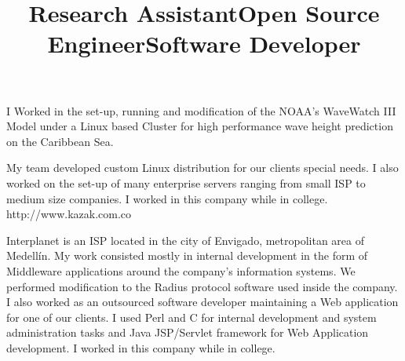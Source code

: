 \begin{resume}
\title{\textbf{Research Assistant}}
\begin{position}
I Worked in the set-up, running and modification of the NOAA's WaveWatch III Model under a Linux based Cluster
for high performance wave height prediction on the Caribbean Sea.
\end{position}


\title{\textbf{Open Source Engineer}}
\begin{position}
My team developed custom  Linux distribution for our clients
special needs. I also worked on  the set-up of many enterprise
servers ranging from small ISP to medium size companies. I worked in this company while in college.
http://www.kazak.com.co
\end{position}
\newline
\newline
\newline
\newline
\newline



\title{\textbf{Software Developer}}
\begin{position}
Interplanet is an  ISP located in the city of Envigado, metropolitan area of Medell\'{i}n.
My work consisted mostly  in internal development in the form of
Middleware applications  around the company's information systems.
We performed modification to the Radius protocol software used inside the company.
I also worked as an outsourced software developer maintaining a Web
application for one of our clients.  I used Perl and C for internal
development and  system administration tasks and Java JSP/Servlet
framework for Web Application development. I worked in this company
while in college.
\end{position}



\end{resume}
